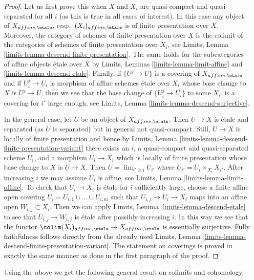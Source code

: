 \begin{proof}
Let us first prove this when $X$ and $X_i$ are quasi-compact and
quasi-separated for all $i$ (as this is true in all cases of
interest). In this case any object of
$X_{affine, \etale}$, resp.\ $(X_i)_{affine, \etale}$ is
of finite presentation over $X$. Moreover, the
category of schemes of finite presentation over $X$ is the
colimit of the categories of schemes of finite presentation
over $X_i$, see
Limits, Lemma \ref{limits-lemma-descend-finite-presentation}.
The same holds for the subcategories of affine objects \'etale
over $X$ by Limits, Lemmas
\ref{limits-lemma-limit-affine} and \ref{limits-lemma-descend-etale}.
Finally, if $\{U^j \to U\}$ is a covering of $X_{affine, \etale}$
and if $U_i^j \to U_i$ is morphism of affine schemes \'etale over
$X_i$ whose base change to $X$ is $U^j \to U$, then we see that
the base change of $\{U^j_i \to U_i\}$ to some $X_{i'}$ is
a covering for $i'$ large enough, see
Limits, Lemma \ref{limits-lemma-descend-surjective}.

\medskip\noindent
In the general case, let $U$ be an object of $X_{affine, \etale}$.
Then $U \to X$ is \'etale and separated (as $U$ is separated)
but in general not quasi-compact. Still, $U \to X$ is locally
of finite presentation and hence by
Limits, Lemma \ref{limits-lemma-descend-finite-presentation-variant}
there exists an $i$, a quasi-compact and quasi-separated scheme $U_i$, and
a morphism $U_i \to X_i$ which is locally of finite presentation
whose base change to $X$ is $U \to X$. Then $U = \lim_{i' \geq i} U_{i'}$
where $U_{i'} = U_i \times_{X_i} X_{i'}$.
After increasing $i$ we may assume $U_i$ is affine, see
Limits, Lemma \ref{limits-lemma-limit-affine}.
To check that $U_i \to X_i$ is \'etale for $i$ sufficiently large,
choose a finite affine open covering $U_i = U_{i, 1} \cup \ldots \cup U_{i, m}$
such that $U_{i, j} \to U_i \to X_i$ maps into an affine open
$W_{i, j} \subset X_i$. Then we can apply
Limits, Lemma \ref{limits-lemma-descend-etale}
to see that $U_{i, j} \to W_{i, j}$ is \'etale
after possibly increasing $i$.
In this way we see that the functor
$\colim (X_i)_{affine, \etale} \to X_{affine, \etale}$
is essentially surjective. Fully faithfulness follows
directly from the already used
Limits, Lemma \ref{limits-lemma-descend-finite-presentation-variant}.
The statement on coverings is proved in exactly the same
manner as done in the first paragraph of the proof.
\end{proof}

Using the above we get the following general result on colimits and cohomology.

